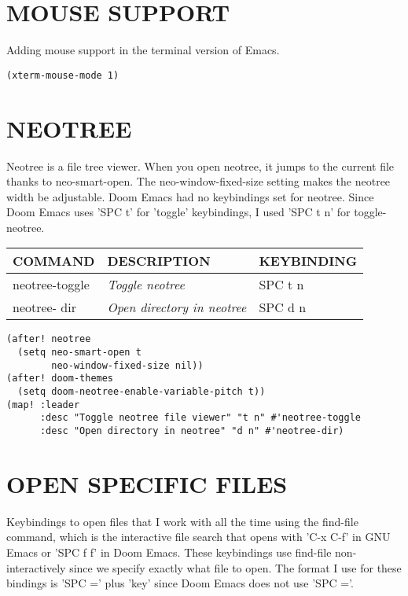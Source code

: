 \documentclass[11pt]{article}
\begin{document}
\section{MOUSE SUPPORT}
\label{sec:org4c4007e}
Adding mouse support in the terminal version of Emacs.

\begin{verbatim}
(xterm-mouse-mode 1)
\end{verbatim}

\section{NEOTREE}
\label{sec:org2e1d881}
Neotree is a file tree viewer.  When you open neotree, it jumps to the current file thanks to neo-smart-open.  The neo-window-fixed-size setting makes the neotree width be adjustable.  Doom Emacs had no keybindings set for neotree.  Since Doom Emacs uses 'SPC t' for 'toggle' keybindings, I used 'SPC t n' for toggle-neotree.

\begin{center}
\begin{tabular}{lll}
COMMAND & DESCRIPTION & KEYBINDING\\[0pt]
\hline
neotree-toggle & \emph{Toggle neotree} & SPC t n\\[0pt]
neotree- dir & \emph{Open directory in neotree} & SPC d n\\[0pt]
\end{tabular}
\end{center}

\begin{verbatim}
(after! neotree
  (setq neo-smart-open t
        neo-window-fixed-size nil))
(after! doom-themes
  (setq doom-neotree-enable-variable-pitch t))
(map! :leader
      :desc "Toggle neotree file viewer" "t n" #'neotree-toggle
      :desc "Open directory in neotree" "d n" #'neotree-dir)
\end{verbatim}

\section{OPEN SPECIFIC FILES}
\label{sec:org0621b21}
Keybindings to open files that I work with all the time using the find-file command, which is the interactive file search that opens with 'C-x C-f' in GNU Emacs or 'SPC f f' in Doom Emacs.  These keybindings use find-file non-interactively since we specify exactly what file to open.  The format I use for these bindings is 'SPC =' plus 'key' since Doom Emacs does not use 'SPC ='.
\end{document}
